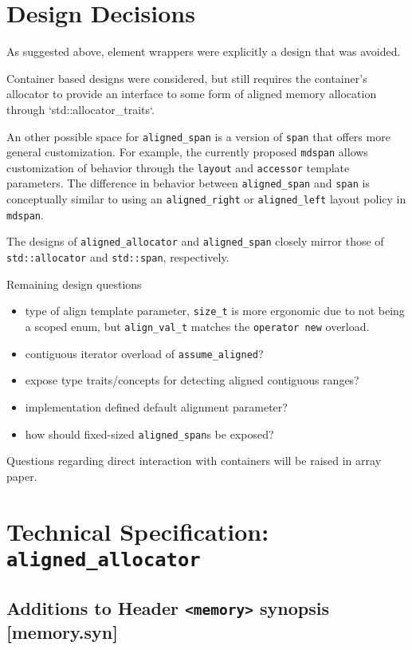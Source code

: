 \documentclass[11pt]{article}
\begin{document}
\section{Design Decisions}

As suggested above, element wrappers were explicitly a design that was avoided.

Container based designs were considered, but still requires the container's allocator to provide an interface to some form of aligned memory allocation through `std::allocator\_traits`.

An other possible space for \texttt{aligned\_span} is a version of \texttt{span} that offers more general customization. For example, the currently proposed \texttt{mdspan} allows customization of behavior through the \texttt{layout} and \texttt{accessor} template parameters. The difference in behavior between \texttt{aligned\_span} and \texttt{span} is conceptually similar to using an \texttt{aligned\_right} or \texttt{aligned\_left} layout policy in \texttt{mdspan}.

The designs of \texttt{aligned\_allocator} and \texttt{aligned\_span} closely mirror those of \texttt{std::allocator} and \texttt{std::span}, respectively.

Remaining design questions
\begin{itemize}
	\item type of align template parameter, \texttt{size\_t} is more ergonomic due to not being a scoped enum, but \texttt{align\_val\_t} matches the \texttt{operator new} overload.
	\item contiguous iterator overload of \texttt{assume\_aligned}?
	\item expose type traits/concepts for detecting aligned contiguous ranges?
	\item implementation defined default alignment parameter?
	\item how should fixed-sized \texttt{aligned\_span}s be exposed? 
\end{itemize}

Questions regarding direct interaction with containers will be raised in array paper.

\section{Technical Specification: \texttt{aligned\_allocator}}

\subsection{Additions to Header \texttt{<memory>} synopsis [memory.syn]}
\end{document}
